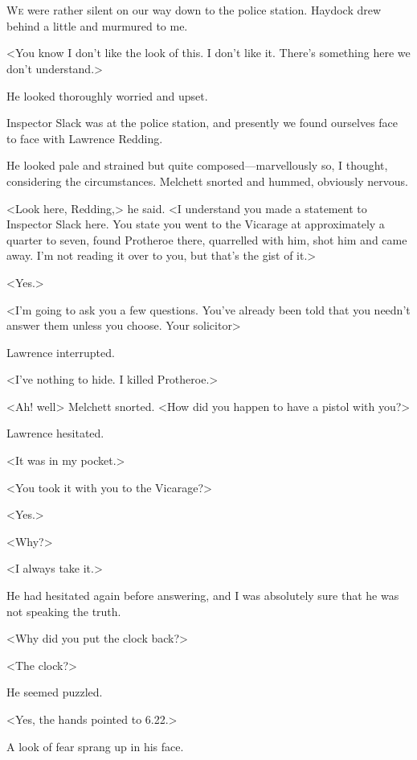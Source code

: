 \chapter[Chapter  \thechapter]{}


\lettrine{W}{e} were rather silent on our way down to the police station. Haydock drew behind a little and murmured to me.

\zz
<You know I don't like the look of this. I don't like it. There's something here we don't understand.>

He looked thoroughly worried and upset.

Inspector Slack was at the police station, and presently we found ourselves face to face with Lawrence Redding.

He looked pale and strained but quite composed—marvellously so, I thought, considering the circumstances. Melchett snorted and hummed, obviously nervous.

<Look here, Redding,> he said. <I understand you made a statement to Inspector Slack here. You state you went to the Vicarage at approximately a quarter to seven, found Protheroe there, quarrelled with him, shot him and came away. I'm not reading it over to you, but that's the gist of it.>

<Yes.>

<I'm going to ask you a few questions. You've already been told that you needn't answer them unless you choose. Your solicitor\longdash>

Lawrence interrupted.

<I've nothing to hide. I killed Protheroe.>

<Ah! well\longdash> Melchett snorted. <How did you happen to have a pistol with you?>

Lawrence hesitated.

<It was in my pocket.>

<You took it with you to the Vicarage?>

<Yes.>

<Why?>

<I always take it.>

He had hesitated again before answering, and I was absolutely sure that he was not speaking the truth.

<Why did you put the clock back?>

<The clock?>

He seemed puzzled.

<Yes, the hands pointed to 6.22.>

A look of fear sprang up in his face.


